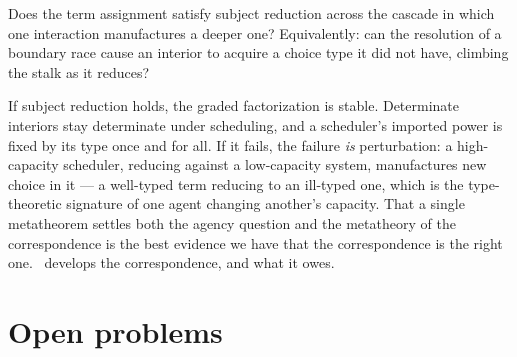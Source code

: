 \begin{question}\label{ndo:q:sr}
Does the term assignment satisfy subject reduction across the cascade in which one
interaction manufactures a deeper one? Equivalently: can the resolution of a boundary
race cause an interior to acquire a choice type it did not have, climbing the stalk as
it reduces?
\end{question}

\noindent
If subject reduction holds, the graded factorization is stable. Determinate interiors
stay determinate under scheduling, and a scheduler's imported power is fixed by its
type once and for all. If it fails, the failure \emph{is} perturbation: a high-capacity
scheduler, reducing against a low-capacity system, manufactures new choice in it --- a
well-typed term reducing to an ill-typed one, which is the type-theoretic signature of
one agent changing another's capacity. That a single metatheorem settles both the
agency question and the metatheory of the correspondence is the best evidence we have
that the correspondence is the right one. \chChs\ develops the correspondence, and
what it owes.

\section{Open problems}\label{ndo:sec:open}

